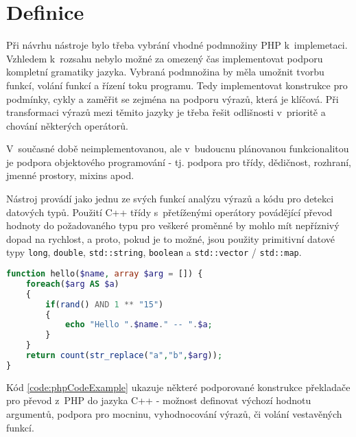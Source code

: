 \documentclass[czech]{ExcelAtFIT}
\newcommand{\function}[1]{\texttt{#1}}
\begin{document}
\section{Definice}

	Při návrhu nástroje bylo třeba vybrání vhodné pod\-mno\-žin\-y PHP k~implemetaci. Vzhledem k~rozsahu nebylo možné za omezený čas implementovat podporu kompletní gramatiky jazyka. Vybraná podmnožina by měla umožnit tvorbu funkcí, volání funkcí a řízení toku programu. Tedy implementovat konstrukce pro podmínky, cykly a zaměřit se zejména na podporu výrazů, která je klíčová. Při transformaci výrazů mezi těmito jazyky je třeba řešit odlišnosti v~prioritě a chování některých operátorů.

	V~současné době neimplementovanou, ale v~budoucnu plánovanou funkcionalitou je podpora objektového programování - tj. podpora pro třídy, dědičnost, rozhraní, jmenné prostory, mixins apod.

	Nástroj provádí jako jednu ze svých funkcí analýzu výrazů a kódu pro detekci datových typů. Použití C++ třídy s~přetíženými operátory povádějící převod hodnoty do požadovaného typu pro veškeré proměnné by mohlo mít nepříznivý dopad na rychlost, a proto, pokud je to možné, jsou použity primitivní datové typy \function{long}, \function{double}, \function{std::string}, \function{boolean} a \function{std::vector} / \function{std::map}.

\begin{lstlisting}[caption=Podporované výrazy PHP, label=code:phpCodeExample, language=PHP]
function hello($name, array $arg = []) {
	foreach($arg AS $a)
	{
		if(rand() AND 1 ** "15")
		{
			echo "Hello ".$name." -- ".$a;
		}
	}
	return count(str_replace("a","b",$arg));
}
\end{lstlisting}

	Kód \ref{code:phpCodeExample} ukazuje některé podporované konstrukce překladače pro převod z~PHP do jazyka C++ - možnost definovat výchozí hodnotu argumentů, podpora pro mocninu, vyhodnocování výrazů, či volání vestavěných funkcí.



\end{document}
